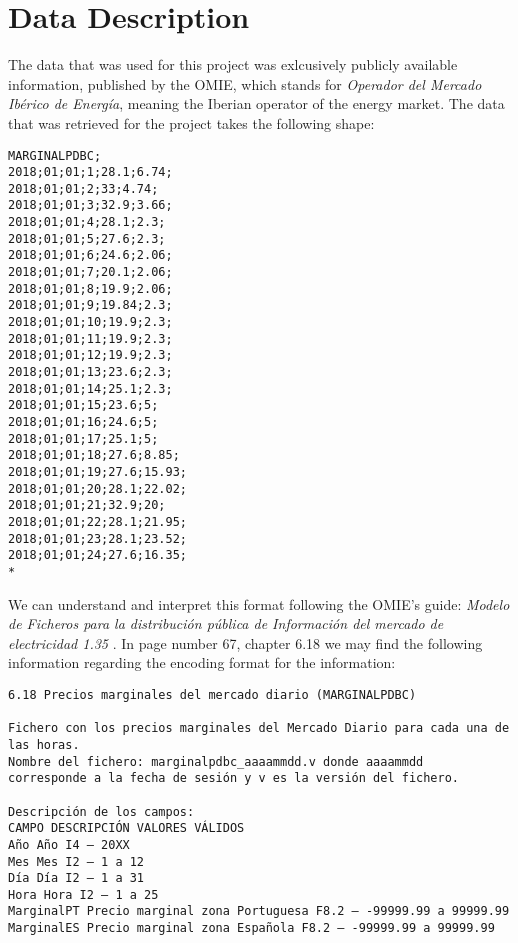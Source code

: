 \documentclass[12pt]{report} %
\begin{document}
\section{Data Description} %
The data that was used for this project was exlcusively publicly available information, published by the OMIE, which stands for \textit{Operador del Mercado Ibérico de Energía}, meaning the Iberian operator of the energy market. The data that was retrieved for the project takes the following shape:

\begin{small}
\begin{verbatim}
MARGINALPDBC;
2018;01;01;1;28.1;6.74;
2018;01;01;2;33;4.74;
2018;01;01;3;32.9;3.66;
2018;01;01;4;28.1;2.3;
2018;01;01;5;27.6;2.3;
2018;01;01;6;24.6;2.06;
2018;01;01;7;20.1;2.06;
2018;01;01;8;19.9;2.06;
2018;01;01;9;19.84;2.3;
2018;01;01;10;19.9;2.3;
2018;01;01;11;19.9;2.3;
2018;01;01;12;19.9;2.3;
2018;01;01;13;23.6;2.3;
2018;01;01;14;25.1;2.3;
2018;01;01;15;23.6;5;
2018;01;01;16;24.6;5;
2018;01;01;17;25.1;5;
2018;01;01;18;27.6;8.85;
2018;01;01;19;27.6;15.93;
2018;01;01;20;28.1;22.02;
2018;01;01;21;32.9;20;
2018;01;01;22;28.1;21.95;
2018;01;01;23;28.1;23.52;
2018;01;01;24;27.6;16.35;
*
\end{verbatim}
\end{small}

We can understand and interpret this format following the OMIE's guide: \textit{Modelo de Ficheros para la distribución pública de Información del mercado de electricidad 1.35} \cite{omie_formatos_2024}. In page number 67, chapter 6.18 we may find the following information regarding the encoding format for the information:

\begin{small} %
\begin{verbatim}
6.18 Precios marginales del mercado diario (MARGINALPDBC)

Fichero con los precios marginales del Mercado Diario para cada una de
las horas.
Nombre del fichero: marginalpdbc_aaaammdd.v donde aaaammdd
corresponde a la fecha de sesión y v es la versión del fichero.

Descripción de los campos:
CAMPO DESCRIPCIÓN VALORES VÁLIDOS
Año Año I4 – 20XX
Mes Mes I2 – 1 a 12
Día Día I2 – 1 a 31
Hora Hora I2 – 1 a 25
MarginalPT Precio marginal zona Portuguesa F8.2 – -99999.99 a 99999.99
MarginalES Precio marginal zona Española F8.2 – -99999.99 a 99999.99
\end{verbatim}
\end{small}
\end{document}
